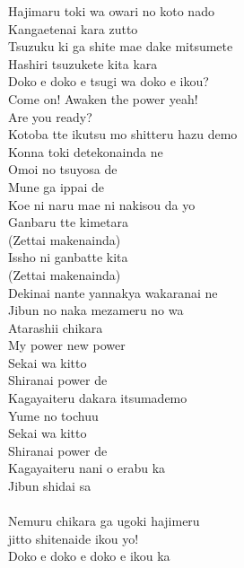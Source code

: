 \def\songtitle{Awaken the Power}
\def\songcomment{Season 2 Insert Song}
\def\songlyrics{Aki Hata}
\def\songwriter{Takao Kawada}
\def\songarrange{Takao Kawada}
   
\ifdefined\COMPLETE
\else
	
	
\fi
\thispagestyle{song}

\begin{multicols}{2}\small
Hajimaru toki wa owari no koto nado\\
Kangaetenai kara zutto\\
Tsuzuku ki ga shite mae dake mitsumete\\
Hashiri tsuzukete kita kara\\
Doko e doko e tsugi wa doko e ikou?\\

Come on! Awaken the power yeah!\\
Are you ready? \\

Kotoba tte ikutsu mo shitteru hazu demo\\
Konna toki detekonainda ne\\
Omoi no tsuyosa de\\
Mune ga ippai de\\
Koe ni naru mae ni nakisou da yo\\

Ganbaru tte kimetara\\
(Zettai makenainda)\\
Issho ni ganbatte kita\\
(Zettai makenainda)\\
Dekinai nante yannakya wakaranai ne\\
Jibun no naka mezameru no wa\\
Atarashii chikara\\
My power new power \\

Sekai wa kitto \\
Shiranai power de \\
Kagayaiteru dakara itsumademo\\
Yume no tochuu\\
Sekai wa kitto \\
Shiranai power de \\
Kagayaiteru nani o erabu ka\\
Jibun shidai sa\\
\\
Nemuru chikara ga ugoki hajimeru\\
 jitto shitenaide ikou yo!\\
Doko e doko e doko e ikou ka\columnbreak


\end{multicols}
